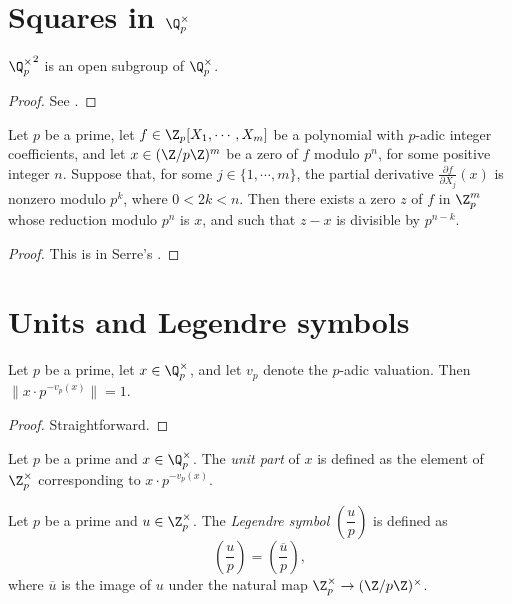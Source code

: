 \section[Squares in the p-adic units]{Squares in $\Q_p^{\times}$}\label{sec:padic_squares}

\begin{theorem}\label{thm:padic_squares_open}
\leanok
${\Q_p^\times}^2$ is an open subgroup of $\Q_p^\times$.
\end{theorem}

\begin{proof}
See \cite[\S II.3.3]{Ser73}.
\end{proof}

\begin{lemma}
  \label{lem:multivariable_hensel}
  \leanok
Let $p$ be a prime, let $f \in \Z_p[X_1, \cdots, X_m]$ be a polynomial with $p$-adic integer
coefficients, and let $x \in (\Z/p\Z)^m$ be a zero of $f$ modulo $p^n$, for some positive integer
$n$. Suppose that, for some $j \in \{1, \cdots, m\}$, the partial derivative
$\frac{\partial f}{\partial X_j}(x)$ is nonzero modulo $p^k$, where $0 < 2k < n$.
Then there exists a zero $z$ of $f$ in $\Z_p^m$ whose reduction modulo $p^n$ is $x$, and such that
$z-x$ is divisible by $p^{n-k}$.
\end{lemma}

\begin{proof}
This is in Serre's \cite[\S II.2 Theorem 1]{Ser73}.
\end{proof}

\section[Units and Legendre symbols]{Units and Legendre symbols}\label{sec:padic_legendre}

\begin{lemma}\label{lem:padic_unit_part_unit}
\leanok
Let $p$ be a prime, let $x \in \Q_p^\times$, and let $v_p$ denote the $p$-adic valuation. Then $\|x \cdot p^{-v_p(x)}\| = 1$.
\end{lemma}
\begin{proof}
\leanok
Straightforward.
\end{proof}

\begin{definition}\label{def:padicUnitPart}
  \leanok
Let $p$ be a prime and $x \in \Q_p^\times$. The \emph{unit part} of $x$ is defined as the element
of $\Z_p^\times$ corresponding to $x \cdot p^{-v_p(x)}$.
\end{definition}

\begin{definition}\label{def:legendreSym}
  \leanok
Let $p$ be a prime and $u \in \Z_p^\times$. The \emph{Legendre symbol} $\left(\dfrac{u}{p}\right)$
is defined as
\[\left(\dfrac{u}{p}\right)=\left(\dfrac{\overline{u}}{p}\right),\]
where $\overline{u}$ is the image of $u$ under the natural map $\Z_p^\times \to (\Z/p\Z)^\times$.
\end{definition}
